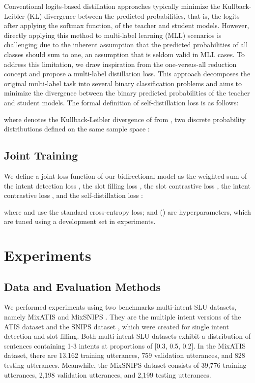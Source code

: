 \documentclass{ecai}
\begin{document}
Conventional logits-based distillation approaches typically minimize the Kullback-Leibler (KL) divergence between the predicted probabilities, that is, the logits after applying the softmax function, of the teacher and student models. However, directly applying this method to multi-label learning (MLL) scenarios is challenging due to the inherent assumption that the predicted probabilities of all classes should sum to one, an assumption that is seldom valid in MLL cases. To address this limitation, we draw inspiration from the one-versus-all reduction concept and propose a multi-label distillation loss. This approach decomposes the original multi-label task into several binary classification problems and aims to minimize the divergence between the binary predicted probabilities of the teacher and student models. The formal definition of self-distillation loss is as follows:





where  denotes the Kullback-Leibler divergence of  from , two discrete probability distributions defined on the same sample space :


\subsection{Joint Training}
We define a joint loss function  of our bidirectional model as the weighted sum of the intent detection loss , the slot filling loss , the slot contrastive loss , the intent contrastive loss , and the self-distillation loss :  

where  and  use the standard cross-entropy loss; and  () are hyperparameters, which are tuned using a development set in experiments.

\section{Experiments}
\subsection{Data and Evaluation Methods}
We performed experiments using two benchmarks multi-intent SLU datasets, namely MixATIS and MixSNIPS \cite{qin:2020}. They are the multiple intent versions of the ATIS dataset \cite{Hemphill:1990} and the SNIPS dataset \cite{Coucke:2018}, which were created for single intent detection and slot filling. Both multi-intent SLU datasets exhibit a distribution of sentences containing 1-3 intents at proportions of [0.3, 0.5, 0.2]. In the MixATIS dataset, there are 13,162 training utterances, 759 validation utterances, and 828 testing utterances. Meanwhile, the MixSNIPS dataset consists of 39,776 training utterances, 2,198 validation utterances, and 2,199 testing utterances.
\end{document}
